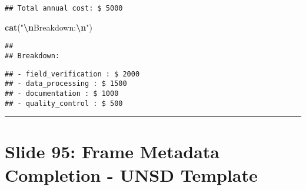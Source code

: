 \documentclass[
]{article}
\newenvironment{Shaded}{\begin{snugshade}}{\end{snugshade}}
\newcommand{\ControlFlowTok}[1]{\textcolor[rgb]{0.13,0.29,0.53}{\textbf{#1}}}
\newcommand{\FunctionTok}[1]{\textcolor[rgb]{0.13,0.29,0.53}{\textbf{#1}}}
\newcommand{\NormalTok}[1]{#1}
\newcommand{\SpecialCharTok}[1]{\textcolor[rgb]{0.81,0.36,0.00}{\textbf{#1}}}
\newcommand{\StringTok}[1]{\textcolor[rgb]{0.31,0.60,0.02}{#1}}
\begin{document}
\begin{Shaded}
\end{Shaded}

\begin{verbatim}
## Total annual cost: $ 5000
\end{verbatim}

\begin{Shaded}
\begin{Highlighting}[]
\FunctionTok{cat}\NormalTok{(}\StringTok{"}\SpecialCharTok{\textbackslash{}n}\StringTok{Breakdown:}\SpecialCharTok{\textbackslash{}n}\StringTok{"}\NormalTok{)}
\end{Highlighting}
\end{Shaded}

\begin{verbatim}
## 
## Breakdown:
\end{verbatim}

\begin{Shaded}
\end{Shaded}

\begin{verbatim}
## - field_verification : $ 2000 
## - data_processing : $ 1500 
## - documentation : $ 1000 
## - quality_control : $ 500
\end{verbatim}

\begin{center}\rule{0.5\linewidth}{0.5pt}\end{center}

\section{Slide 95: Frame Metadata Completion - UNSD
Template}\label{slide-95-frame-metadata-completion---unsd-template}
\end{document}
